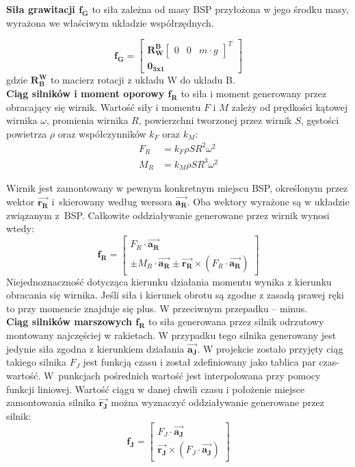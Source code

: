 \textbf{Siła grawitacji  $\bm{f_G}$} to siła zależna od masy BSP przyłożona w jego środku masy, wyrażona we właściwym układzie współrzędnych.

\[
	 \bm{f_G} = \begin{bmatrix} \bm{R_W^B}\begin{bmatrix}0 & 0 & m \cdot g\end{bmatrix}^T  \\ \bm{0_{3x1}}  \end{bmatrix} 
\]
gdzie $\bm{R_B^W}$ to macierz rotacji z układu W do układu B.\\

\textbf{Ciąg silników i moment oporowy  $\bm{f_R}$} to siła i moment generowany przez obracający się wirnik. Wartość siły i momentu $F$ i $M$ zależy od prędkości kątowej wirnika $\omega$, promienia wirnika $R$, powierzchni tworzonej przez wirnik $S$, gęstości powietrza $\rho$ oraz współczynników $k_F$ oraz $k_M$:
\[
	\begin{aligned}
	F_R & = k_F \rho S R^2 \omega^2\\
	M_R & = k_M \rho S R^3 \omega^2
	\end{aligned}
\]

Wirnik jest zamontowany w pewnym konkretnym miejscu BSP, określonym przez wektor $\bm{\vec{r_R}}$ i~skierowany według wersora $\bm{\vec{a_R}}$. Oba wektory wyrażone są w układzie związanym z~BSP. Całkowite oddziaływanie generowane przez wirnik wynosi wtedy:
\[
	\bm{f_R} =  \begin{bmatrix} F_R \cdot  \bm{\vec{a_R}} \\   \pm M_R \cdot \bm{\vec{a_R}} \pm  \bm{\vec{r_R}} \times \left( F_R \cdot  \bm{\vec{a_R}} \right) \end{bmatrix}
\]
Niejednoznaczność dotycząca kierunku działania momentu wynika z kierunku obracania się wirnika. Jeśli siła i kierunek obrotu są zgodne z zasadą prawej ręki to przy momencie znajduje się plus. W przeciwnym przepadku -- minus.\\

\textbf{Ciąg silników marszowych $\bm{f_R}$} to siła generowana przez silnik odrzutowy montowany najczęściej w rakietach. W przypadku tego silnika generowany jest jedynie siła zgodna z kierunkiem działania $\bm{\vec{a_J}}$. W projekcie zostało przyjęty ciąg takiego silnika $F_J$ jest funkcją czasu i został zdefiniowany jako tablica par czas-wartość. W~punkcjach pośrednich wartość jest interpolowana przy pomocy funkcji liniowej. Wartość ciągu w danej chwili czasu i położenie miejsce zamontowania silnika $\bm{\vec{r_J}}$ można wyznaczyć oddziaływanie generowane przez silnik:
\[
	\bm{f_J} =  \begin{bmatrix} F_J \cdot  \bm{\vec{a_J}} \\  \bm{\vec{r_J}} \times \left( F_J \cdot  \bm{\vec{a_J}} \right) \end{bmatrix}
\]

